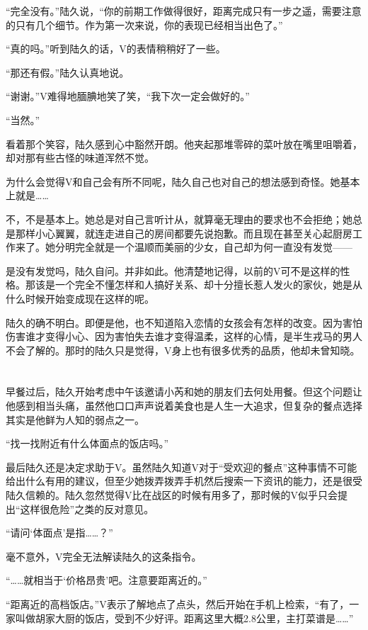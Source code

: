 “完全没有。”陆久说，“你的前期工作做得很好，距离完成只有一步之遥，需要注意的只有几个细节。作为第一次来说，你的表现已经相当出色了。”

“真的吗。”听到陆久的话，V的表情稍稍好了一些。

“那还有假。”陆久认真地说。

“谢谢。”V难得地腼腆地笑了笑，“我下次一定会做好的。”

“当然。”

看着那个笑容，陆久感到心中豁然开朗。他夹起那堆零碎的菜叶放在嘴里咀嚼着，却对那有些古怪的味道浑然不觉。

为什么会觉得V和自己会有所不同呢，陆久自己也对自己的想法感到奇怪。她基本上就是……

不，不是基本上。她总是对自己言听计从，就算毫无理由的要求也不会拒绝；她总是那样小心翼翼，就连走进自己的房间都要先说抱歉。而且现在甚至关心起厨房工作来了。她分明完全就是一个温顺而美丽的少女，自己却为何一直没有发觉——

是没有发觉吗，陆久自问。并非如此。他清楚地记得，以前的V可不是这样的性格。那该是一个完全不懂怎样和人搞好关系、却十分擅长惹人发火的家伙，她是从什么时候开始变成现在这样的呢。

陆久的确不明白。即便是他，也不知道陷入恋情的女孩会有怎样的改变。因为害怕伤害谁才变得小心、因为害怕失去谁才变得温柔，这样的心情，是半生戎马的男人不会了解的。那时的陆久只是觉得，V身上也有很多优秀的品质，他却未曾知晓。

\section*{}

早餐过后，陆久开始考虑中午该邀请小芮和她的朋友们去何处用餐。但这个问题让他感到相当头痛，虽然他口口声声说着美食也是人生一大追求，但复杂的餐点选择其实是他鲜为人知的弱点之一。

“找一找附近有什么体面点的饭店吗。”

最后陆久还是决定求助于V。虽然陆久知道V对于“受欢迎的餐点”这种事情不可能给出什么有用的建议，但至少她拨弄拨弄手机然后搜索一下资讯的能力，还是很受陆久信赖的。陆久忽然觉得V比在战区的时候有用多了，那时候的V似乎只会提出“这样很危险”之类的反对意见。

“请问‘体面点’是指……？”

毫不意外，V完全无法解读陆久的这条指令。

“……就相当于‘价格昂贵’吧。注意要距离近的。”

“距离近的高档饭店。”V表示了解地点了点头，然后开始在手机上检索，“有了，一家叫做胡家大厨的饭店，受到不少好评。距离这里大概2.8公里，主打菜谱是……”

